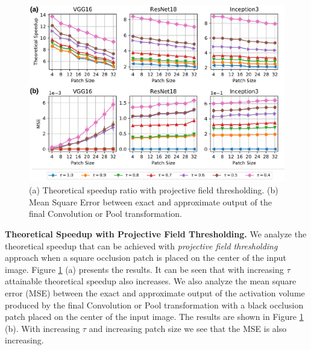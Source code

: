 \begin{figure}[t]
\includegraphics[width=\columnwidth]{images/proj_thresholding}
\caption{(a) Theoretical speedup ratio with projective field thresholding. (b) Mean Square Error between exact and approximate output of the final Convolution or Pool transformation.}
\label{fig:proj_thresholding}
\end{figure}

\vspace{2mm}
\noindent \textbf{Theoretical Speedup with Projective Field Thresholding.}
We analyze the theoretical speedup that can be achieved with \textit{projective field thresholding} approach when a square occlusion patch is placed on the center of the input image.
Figure \ref{fig:proj_thresholding} (a) presents the results.
It can be seen that with increasing $\tau$ attainable theoretical speedup also increases.
We also analyze the mean square error (MSE) between the exact and approximate output of the activation volume produced by the final Convolution or Pool transformation with a black occlusion patch placed on the center of the input image.
The results are shown in Figure \ref{fig:proj_thresholding} (b).
With increasing $\tau$ and increasing patch size we see that the MSE is also increasing.


